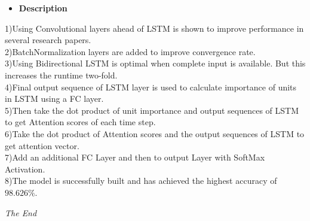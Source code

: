 \documentclass[a4paper,12pt]{article}
\begin{document}
	
	
	
	
	
	
	
	 \begin{itemize}
	    \item \Large\textbf{Description}
	    	\end{itemize}
	
	
	
1)Using Convolutional layers ahead of LSTM is shown to improve performance in several research papers.\\
2)BatchNormalization layers are added to improve convergence rate.\\
3)Using Bidirectional LSTM is optimal when complete input is available. But this increases the runtime two-fold.\\
4)Final output sequence of LSTM layer is used to calculate importance of units in LSTM using a FC layer.\\
5)Then take the dot product of unit importance and output sequences of LSTM to get Attention scores of each time step.\\
6)Take the dot product of Attention scores and the output sequences of LSTM to get attention vector.\\
7)Add an additional FC Layer and then to output Layer with SoftMax Activation.\\
8)The model is successfully built and has achieved the highest accuracy of $98.626\%$.
	
	
	
	
	
	
	
	
	
	
	
	
	
	
	
	
	\vfill\emph{The End}
	
\end{document}
